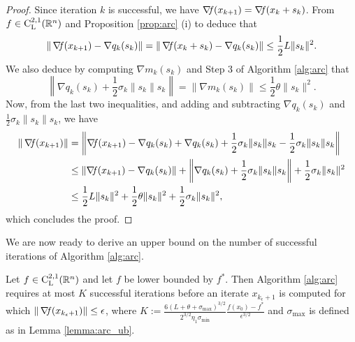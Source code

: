 \documentclass[10pt,a4paper]{article}
\begin{document}
\begin{proof}
Since iteration $k$ is successful, we have $\operatorname*{\mathit{\nabla \!f}}(x_{k+1}) = \operatorname*{\mathit{\nabla \!f}}(x_k + s_k)$. From $f\in \mathord{\mathrm{C^{2,1}_{L}}}(\mathbb{R}^n)$ and Proposition \ref{prop:arc} (i) to deduce that
\begin{equation*}
	\|\operatorname*{\mathit{\nabla \!f}}(x_{k+1}) - \nabla q_k(s_k)\| = \|\operatorname*{\mathit{\nabla \!f}}(x_k + s_k) - \nabla q_k(s_k)\| \leq \frac{1}{2}L\|s_k\|^2.
\end{equation*}	
We also deduce by computing $\nabla m_k(s_k)$ and Step 3 of Algorithm \ref{alg:arc} that
\begin{equation*}
	\left \|\nabla q_k(s_k) + \frac{1}{2}\sigma_k \|s_k\| s_k \right\|=\|\nabla m_k(s_k)\| \leq \frac{1}{2}\theta \|s_k\|^2.
\end{equation*}
Now, from the last two inequalities, and adding and subtracting $\nabla q_k(s_k)$ and $\frac{1}{2}\sigma_k \|s_k\| s_k$, we have 
\begin{align*}
	\|\operatorname*{\mathit{\nabla \!f}}(x_{k+1})\| &= \left\|\operatorname*{\mathit{\nabla \!f}}(x_{k+1}) - \nabla q_k(s_k) + \nabla q_k(s_k) + \frac{1}{2}\sigma_k \|s_k\| s_k - \frac{1}{2}\sigma_k \|s_k\| s_k \right\|\\
	&\leq \left \|\operatorname*{\mathit{\nabla \!f}}(x_{k+1}) - \nabla q_k(s_k) \right \|  + \left\|\nabla q_k(s_k) + \frac{1}{2}\sigma_k \|s_k\| s_k \right \| + \frac{1}{2}\sigma_k \|s_k\|^2\\
	&\leq \frac{1}{2}L\|s_k\|^2 + \frac{1}{2}\theta \|s_k\|^2+ \frac{1}{2}\sigma_k \|s_k\|^2,
\end{align*} 
which concludes the proof.
\end{proof}
\pagebreak 
\noindent We are now ready to derive an upper bound on the number of successful iterations of Algorithm \ref{alg:arc}.

\begin{lemma}
	Let $f\in \mathord{\mathrm{C^{2,1}_{L}}}(\mathbb{R}^n)$ and let $f$ be lower bounded by $f^*$. Then Algorithm \ref{alg:arc} requires at most $K$ successful iterations before an iterate $x_{k_\epsilon+1}$ is computed for which $\|\operatorname*{\mathit{\nabla \!f}}(x_{k_\epsilon+1})\| \leq \epsilon$, where $K:= \frac{6(L + \theta + \sigma_{\max})^{3/2}}{2^{3/2} \eta_1 \sigma_{\min}} \frac{f(x_0) - f^*}{\epsilon^{3/2}}$ and $\sigma_{\max}$ is defined as in Lemma \ref{lemma:arc_ub}.
\end{lemma}
\end{document}
